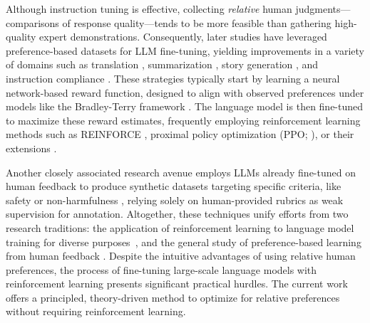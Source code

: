 Although instruction tuning is effective, collecting \textit{relative} human judgments—comparisons of response quality—tends to be more feasible than gathering high-quality expert demonstrations. Consequently, later studies have leveraged preference-based datasets for LLM fine-tuning, yielding improvements in a variety of domains such as translation \citep{kreutzer-etal-2018-reliability}, summarization \citep{stiennon2022learning,ziegler2020finetuning}, story generation \citep{ziegler2020finetuning}, and instruction compliance \citep{ouyang2022training,ramamurthy2023is}. These strategies typically start by learning a neural network-based reward function, designed to align with observed preferences under models like the Bradley-Terry framework \citep{bradley1952rankanalysis}. The language model is then fine-tuned to maximize these reward estimates, frequently employing reinforcement learning methods such as REINFORCE \citep{williams1992reinforce}, proximal policy optimization (PPO; \cite{schulman2017proximal}), or their extensions \citep{ramamurthy2023is}.

Another closely associated research avenue employs LLMs already fine-tuned on human feedback to produce synthetic datasets targeting specific criteria, like safety or non-harmfulness \citep{bai2022constitutional}, relying solely on human-provided rubrics as weak supervision for annotation. Altogether, these techniques unify efforts from two research traditions: the application of reinforcement learning to language model training for diverse purposes~\citep{Ranzato2015SequenceLT,paulus2018a,wu2018learning}, and the general study of preference-based learning from human feedback \citep{christiano2017deep,kupcsik2018learning}. Despite the intuitive advantages of using relative human preferences, the process of fine-tuning large-scale language models with reinforcement learning presents significant practical hurdles. The current work offers a principled, theory-driven method to optimize for relative preferences without requiring reinforcement learning.

